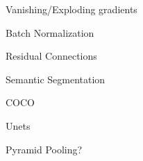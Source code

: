 \begin{frame}
  Vanishing/Exploding gradients
\end{frame}


\begin{frame}
  Batch Normalization
\end{frame}


\begin{frame}
  Residual Connections
\end{frame}


\begin{frame}
  Semantic Segmentation
  \note{
    \begin{itemize}
      \item
      \item
    \end{itemize}
  }
\end{frame}


\begin{frame}
  COCO
  \note{
    \begin{itemize}
      \item
      \item
    \end{itemize}
  }
\end{frame}


\begin{frame}
  Unets
  \note{
    \begin{itemize}
      \item
      \item
    \end{itemize}
  }
\end{frame}


\begin{frame}
  Pyramid Pooling?
  \note{
    \begin{itemize}
      \item
      \item
    \end{itemize}
  }
\end{frame}


